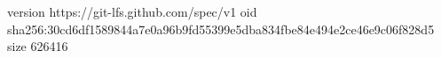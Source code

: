 version https://git-lfs.github.com/spec/v1
oid sha256:30cd6df1589844a7e0a96b9fd55399e5dba834fbe84e494e2ce46e9c06f828d5
size 626416
